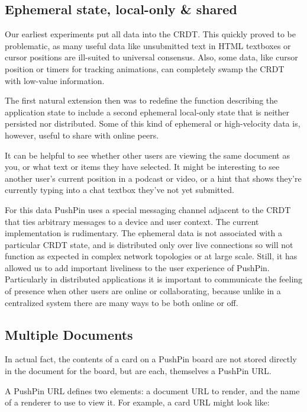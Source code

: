 \documentclass[sigplan,10pt]{acmart}
\begin{document}
\subsection{Ephemeral state, local-only & shared}

Our earliest experiments put all data into the CRDT. This quickly proved to be problematic, as many useful data like unsubmitted text in HTML textboxes or cursor positions are ill-suited to universal consensus. Also, some data, like cursor position or timers for tracking animations, can completely swamp the CRDT with low-value information.

The first natural extension then was to redefine the function describing the application state to include a second ephemeral local-only state that is neither persisted nor distributed. Some of this kind of ephemeral or high-velocity data is, however, useful to share with online peers.

It can be helpful to see whether other users are viewing the same document as you, or what text or items they have selected. It might be interesting to see another user's current position in a podcast or video, or a hint that shows they're currently typing into a chat textbox they've not yet submitted.

For this data PushPin uses a special messaging channel adjacent to the CRDT that ties arbitrary messages to a device and user context. The current implementation is rudimentary. The ephemeral data is not associated with a particular CRDT state, and is distributed only over live connections so will not function as expected in complex network topologies or at large scale. Still, it has allowed us to add important liveliness to the user experience of PushPin. Particularly in distributed applications it is important to communicate the feeling of presence when other users are online or collaborating, because unlike in a centralized system there are many ways to be both online or off.

\subsection{Multiple Documents}
In actual fact, the contents of a card on a PushPin board are not stored directly in the document for the board, but are each, themselves a PushPin URL. 

A PushPin URL defines two elements: a document URL to render, and the name of a renderer to use to view it. For example, a card URL might look like:
\end{document}

